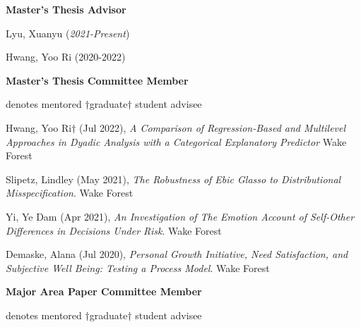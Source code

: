 {\large\textbf{Master's Thesis Advisor}}
\begin{etaremune}%
\item Lyu, Xuanyu  (\textit{2021-Present})
\item Hwang, Yoo Ri (2020-2022)
\end{etaremune}%
%
{\large\textbf{Master's Thesis Committee Member}}
\vspace{-1mm}\begin{center}\footnotesize{denotes mentored $\dagger$graduate$\dagger$ student advisee}\end{center}\vspace{-2mm}
\begin{etaremune}%
\item Hwang, Yoo Ri$\dagger$ (Jul 2022), \textit{A Comparison of Regression-Based and Multilevel Approaches in Dyadic Analysis with a Categorical Explanatory Predictor } Wake Forest%
\item  Slipetz, Lindley (May 2021), \textit{The Robustness of Ebic Glasso to Distributional Misspecification}. Wake Forest
\item Yi, Ye Dam (Apr 2021), \textit{An Investigation of The Emotion Account of Self-Other Differences in Decisions Under Risk}. Wake Forest
\item Demaske, Alana (Jul 2020), \textit{Personal Growth Initiative, Need Satisfaction, and Subjective Well Being: Testing a Process Model}. Wake Forest%
\end{etaremune}%
%
{\large\textbf{Major Area Paper Committee Member}}
\vspace{-1mm}\begin{center}\footnotesize{denotes mentored $\dagger$graduate$\dagger$ student advisee}\end{center}\vspace{-2mm}
